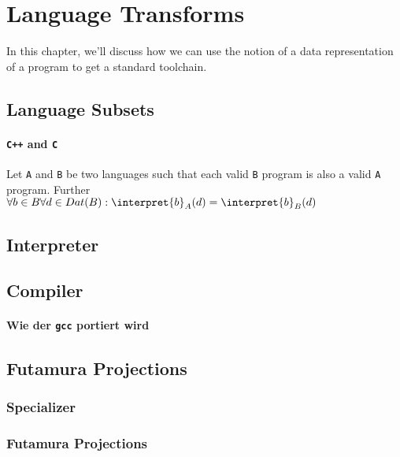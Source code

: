 \section{Language Transforms} %
\label{sec:transforms}
In this chapter, we'll discuss how we can use the notion of a data 
representation of a program to get a standard toolchain.
\subsection{Language Subsets} %
\label{sub:Language Subsets}
\paragraph{{\tt C++}  and {\tt C} } %
\label{par:Cpp and C}
\begin{defn}
	Let {\tt A} and {\tt B} be two languages such that each valid {\tt B} 
	program is also a valid {\tt A} program. Further 
	$\forall b\in B\forall d\in Dat(B): \interpret{b}_A(d) =
	\interpret{b}_B(d)$
\end{defn}

\subsection{Interpreter} %
\label{sub:Interpreter}

\subsection{Compiler} %
\label{sub:Compiler}
\paragraph{Wie der {\tt gcc} portiert wird} %
\label{par:Wie der gcc portiert wird}

\subsection{Futamura Projections} %
\label{sub:Futamura}
\subsubsection{Specializer} %
\label{ssub:Specializer}
\subsubsection{Futamura Projections} %
\label{ssub:Futamura Projections}

